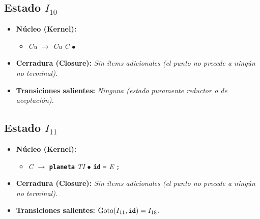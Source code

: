 \documentclass[12pt, letterpaper]{article}
\begin{document}
\subsection*{Estado $I_{10}$ }
\begin{itemize}\setlength{\itemsep}{1pt}\setlength{\parskip}{0pt}
\item \textbf{Núcleo (Kernel):}
\begin{itemize}\setlength{\itemsep}{1pt}\setlength{\parskip}{0pt}
    \item \textit{Cu} $\to$ \textit{Cu} \textit{C} $\bullet$ 
\end{itemize}
\item \textbf{Cerradura (Closure):} \emph{Sin ítems adicionales (el punto no precede a ningún no terminal).}
\item \textbf{Transiciones salientes:} \emph{Ninguna (estado puramente reductor o de aceptación).}
\end{itemize}
\vspace{2pt}
\subsection*{Estado $I_{11}$ }
\begin{itemize}\setlength{\itemsep}{1pt}\setlength{\parskip}{0pt}
\item \textbf{Núcleo (Kernel):}
\begin{itemize}\setlength{\itemsep}{1pt}\setlength{\parskip}{0pt}
    \item \textit{C} $\to$ \textbf{\texttt{planeta}} \textit{TI} $\bullet$ \textbf{\texttt{id}} \texttt{=} \textit{E} \texttt{;}
\end{itemize}
\item \textbf{Cerradura (Closure):} \emph{Sin ítems adicionales (el punto no precede a ningún no terminal).}
\item \textbf{Transiciones salientes:} $\text{Goto}(I_{11}, \textbf{\texttt{id}}) = I_{18}$.
\end{itemize}
\vspace{2pt}
\end{document}
